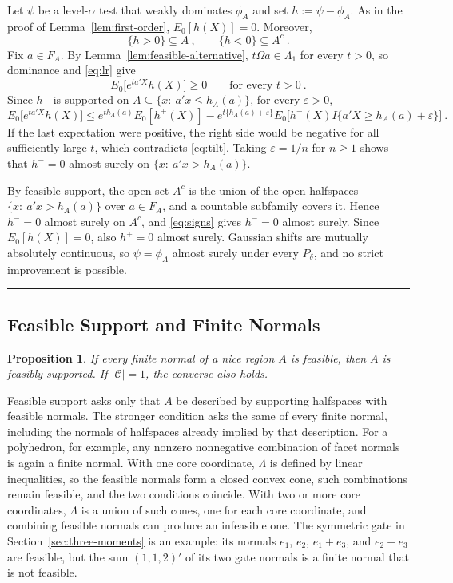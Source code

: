 \documentclass[11pt]{article}
\numberwithin{equation}{section}
\def\qed{\rule{2mm}{2mm}}
\newtheorem{proposition}{Proposition}
\theoremstyle{definition}
\begin{document}
Let $\psi$ be a level-$\alpha$ test that weakly dominates $\phi_A$ and set $h:=\psi-\phi_A$. As in the proof of Lemma~\ref{lem:first-order}, $E_0[h(X)]=0$. Moreover,
\begin{equation}\label{eq:signs}
\{h>0\}\subseteq A~,
\qquad
\{h<0\}\subseteq A^c~.
\end{equation}
Fix $a\in F_A$. By Lemma~\ref{lem:feasible-alternative}, $t\Omega a\in\Lambda_1$ for every $t>0$, so dominance and \eqref{eq:lr} give
\begin{equation}\label{eq:tilt}
E_0\big[e^{ta'X}h(X)\big]\ge0
\qquad\text{for every }t>0~.
\end{equation}
Since $h^+$ is supported on $A\subseteq\{x:\ a'x\le h_A(a)\}$, for every $\varepsilon>0$,
\[
E_0\big[e^{ta'X}h(X)\big]
\le e^{th_A(a)}E_0[h^+(X)]
-e^{t\{h_A(a)+\varepsilon\}}E_0\big[h^-(X)I\{a'X\ge h_A(a)+\varepsilon\}\big]~.
\]
If the last expectation were positive, the right side would be negative for all sufficiently large $t$, which contradicts \eqref{eq:tilt}. Taking $\varepsilon=1/n$ for $n\ge1$ shows that $h^-=0$ almost surely on $\{x:\ a'x>h_A(a)\}$.

By feasible support, the open set $A^c$ is the union of the open halfspaces $\{x:\ a'x>h_A(a)\}$ over $a\in F_A$, and a countable subfamily covers it. Hence $h^-=0$ almost surely on $A^c$, and \eqref{eq:signs} gives $h^-=0$ almost surely. Since $E_0[h(X)]=0$, also $h^+=0$ almost surely. Gaussian shifts are mutually absolutely continuous, so $\psi=\phi_A$ almost surely under every $P_\delta$, and no strict improvement is possible. \qed

\subsection{Feasible Support and Finite Normals}\label{app:normal-conditions}

\begin{proposition}\label{prop:relation}
If every finite normal of a nice region $A$ is feasible, then $A$ is feasibly supported. If $|\mathcal C|=1$, the converse also holds.
\end{proposition}

Feasible support asks only that $A$ be described by supporting halfspaces with feasible normals. The stronger condition asks the same of every finite normal, including the normals of halfspaces already implied by that description. For a polyhedron, for example, any nonzero nonnegative combination of facet normals is again a finite normal. With one core coordinate, $\Lambda$ is defined by linear inequalities, so the feasible normals form a closed convex cone, such combinations remain feasible, and the two conditions coincide. With two or more core coordinates, $\Lambda$ is a union of such cones, one for each core coordinate, and combining feasible normals can produce an infeasible one. The symmetric gate in Section~\ref{sec:three-moments} is an example: its normals $e_1$, $e_2$, $e_1+e_3$, and $e_2+e_3$ are feasible, but the sum $(1,1,2)'$ of its two gate normals is a finite normal that is not feasible.
\end{document}
